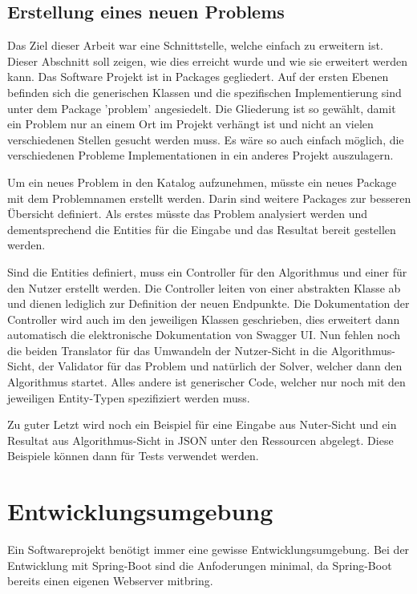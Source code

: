 \FloatBarrier

\subsection{Erstellung eines neuen Problems}
Das Ziel dieser Arbeit war eine Schnittstelle, welche einfach zu erweitern ist. Dieser Abschnitt soll zeigen, wie dies erreicht wurde und wie sie erweitert werden kann. Das Software Projekt ist in 
Packages gegliedert. Auf der ersten Ebenen befinden sich die generischen Klassen und die spezifischen Implementierung sind unter dem Package 'problem'  angesiedelt. Die Gliederung ist so 
gewählt, damit ein Problem nur an einem Ort im Projekt verhängt ist und nicht an vielen verschiedenen Stellen gesucht werden muss. Es wäre so auch einfach möglich, die verschiedenen 
Probleme Implementationen in ein anderes Projekt auszulagern.

Um ein neues Problem in den Katalog aufzunehmen, 
müsste ein neues Package mit dem Problemnamen erstellt werden. Darin sind weitere Packages zur besseren Übersicht definiert. Als erstes müsste das Problem analysiert werden und 
dementsprechend die Entities für die Eingabe und das Resultat bereit gestellen werden.

Sind die Entities definiert, muss ein Controller für den Algorithmus und einer für den Nutzer erstellt werden. Die Controller leiten von einer abstrakten Klasse ab und dienen lediglich zur Definition
der neuen Endpunkte. Die Dokumentation der Controller wird auch im den jeweiligen Klassen geschrieben, dies erweitert dann automatisch die elektronische Dokumentation von Swagger UI. 
Nun fehlen noch die beiden Translator für das Umwandeln der Nutzer-Sicht in die Algorithmus-Sicht, der Validator für das Problem und natürlich der Solver, welcher dann den Algorithmus 
startet. Alles andere ist generischer Code, welcher nur noch mit den jeweiligen Entity-Typen spezifiziert werden muss.

Zu guter Letzt wird noch ein Beispiel für eine Eingabe aus Nuter-Sicht und ein Resultat aus Algorithmus-Sicht in JSON unter den Ressourcen abgelegt. Diese Beispiele können dann für Tests 
verwendet werden.

\newpage

\section{Entwicklungsumgebung}\label{entwicklungsumgebung}
Ein Softwareprojekt benötigt immer eine gewisse Entwicklungsumgebung. Bei der Entwicklung mit Spring-Boot sind die Anfoderungen minimal, da Spring-Boot bereits einen eigenen Webserver 
mitbring.

